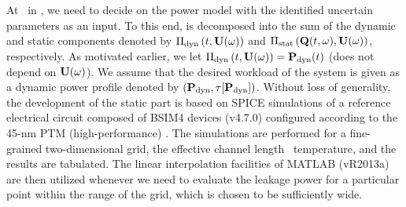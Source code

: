 At \ in , we need to decide on the power model with the identified uncertain parameters as an input.
To this end,  is decomposed into the sum of the dynamic and static components denoted by $\oPower{\dyn}{\t, \vU(\o)}$ and $\oPower{\stat}{\vTO(\t, \o), \vU(\o)}$, respectively.
As motivated earlier, we let $\oPower{\dyn}{\t, \vU(\o)} = \vP_\dyn(\t)$ (does not depend on $\mathbf{U}(\omega)$).
We assume that the desired workload of the system is given as a dynamic power profile denoted by $\profilePdyn$.
Without loss of generality, the development of the static part is based on SPICE simulations of a reference electrical circuit composed of BSIM4 devices (v4.7.0) \cite{bsim} configured according to the 45-nm PTM (high-performance) \cite{ptm}.
The simulations are performed for a fine-grained two-dimensional grid, the effective channel length \vs\ temperature, and the results are tabulated.
The linear interpolation facilities of MATLAB (vR2013a) \cite{matlab} are then utilized whenever we need to evaluate the leakage power for a particular point within the range of the grid, which is chosen to be sufficiently wide.
